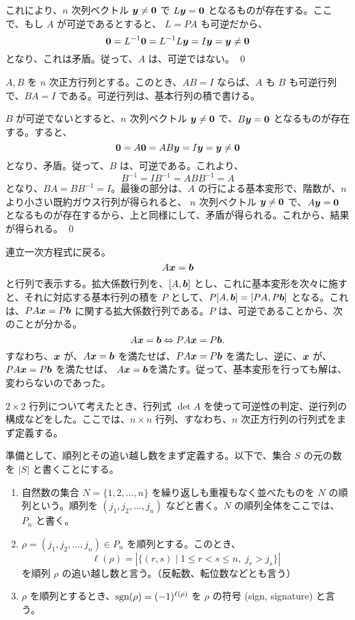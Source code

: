 これにより、$n$ 次列ベクトル $\mbox{\boldmath $y$} \neq \mbox{\boldmath $0$}$ で $L\mbox{\boldmath $y$} = \mbox{\boldmath $0$}$ となるものが存在する。ここで、もし $A$ が可逆であるとすると、
$L = PA$ も可逆だから、
$$\mbox{\boldmath $0$} = L^{-1}\mbox{\boldmath $0$} = L^{-1}L\mbox{\boldmath $y$} = I\mbox{\boldmath $y$} = \mbox{\boldmath $y$} \neq \mbox{\boldmath $0$}$$
となり、これは矛盾。従って、$A$ は、可逆ではない。
\qed

\begin{cor} \label{cor:invertible:elematrix}
$A,B$ を $n$ 次正方行列とする。このとき、$AB = I$ ならば、$A$ も $B$ も可逆行列で、$BA =  I$ である。可逆行列は、基本行列の積で書ける。
\end{cor}
\proof
$B$ が可逆でないとすると、$n$ 次列ベクトル $\mbox{\boldmath $y$}\neq \mbox{\boldmath $0$}$ で、$B\mbox{\boldmath $y$} = \mbox{\boldmath $0$}$ となるものが存在する。すると、
$$\mbox{\boldmath $0$} = A\mbox{\boldmath $0$} = AB\mbox{\boldmath $y$} = I\mbox{\boldmath $y$}  = \mbox{\boldmath $y$} \neq \mbox{\boldmath $0$}$$
となり、矛盾。従って、$B$ は、可逆である。これより、
$$B^{-1} = IB^{-1} = ABB^{-1} = A$$
となり、$BA = BB^{-1} = I$。最後の部分は、$A$ の行による基本変形で、階数が、$n$ より小さい既約ガウス行列が得られると、
$n$ 次列ベクトル $\mbox{\boldmath $y$}\neq \mbox{\boldmath $0$}$ で、$A\mbox{\boldmath $y$} = \mbox{\boldmath $0$}$ となるものが存在するから、上と同様にして、矛盾が得られる。これから、結果が得られる。
\qed

\medskip
連立一次方程式に戻る。
$$A\mbox{\boldmath $x$} = \mbox{\boldmath $b$}$$
と行列で表示する。拡大係数行列を、$[A, \mbox{\boldmath $b$}]$ とし、これに基本変形を次々に施すと、それに対応する基本行列の積を $P$ として、$P[A, \mbox{\boldmath $b$}] = [PA, P\mbox{\boldmath $b$}]$ となる。これは、$PA\mbox{\boldmath $x$} = P\mbox{\boldmath $b$}$ に関する拡大係数行列である。$P$ は、可逆であることから、次のことが分かる。
$$A\mbox{\boldmath $x$} = \mbox{\boldmath $b$} \Leftrightarrow PA\mbox{\boldmath $x$} = P\mbox{\boldmath $b$}.$$
すなわち、$\mbox{\boldmath $x$}$ が、$A\mbox{\boldmath $x$} = \mbox{\boldmath $b$}$ を満たせば、$PA\mbox{\boldmath $x$} = P\mbox{\boldmath $b$}$ を満たし、逆に、$\mbox{\boldmath $x$}$ が、$PA\mbox{\boldmath $x$} = P\mbox{\boldmath $b$}$ を満たせば、 $A\mbox{\boldmath $x$} = \mbox{\boldmath $b$}$を満たす。従って、基本変形を行っても解は、変わらないのであった。

\newpage
{}
$2\times 2$ 行列について考えたとき、行列式 $\det A$ を使って可逆性の判定、逆行列の構成などをした。ここでは、$n\times n$ 行列、すなわち、$n$ 次正方行列の行列式をまず定義する。

準備として、順列とその追い越し数をまず定義する。以下で、集合 $S$ の元の数を $|S|$ と書くことにする。

\begin{definition}
\begin{enumerate}
\item 自然数の集合 $N = \{1,2,\ldots,n\}$ を繰り返しも重複もなく並べたものを $N$ の{\gt 順列}という。順列を $(j_1, j_2,\ldots,j_n)$ などと書く。$N$ の順列全体をここでは、$P_n$ と書く。
\item $\rho = (j_1,j_2,\ldots,j_n)\in P_n$ を順列とする。このとき、
$$\ell(\rho) = |\{(r,s)\mid 1\leq r < s \leq n,\;j_r > j_s\}|$$
を順列 $\rho$ の{\gt 追い越し数}と言う。（反転数、転位数などとも言う）
\item $\rho$ を順列とするとき、$\mbox{{\rm sgn}}(\rho) = (-1)^{\ell(\rho)}$ を $\rho$ の{\gt 符号} (sign, signature) と言う。
\end{enumerate}
\end{definition}

